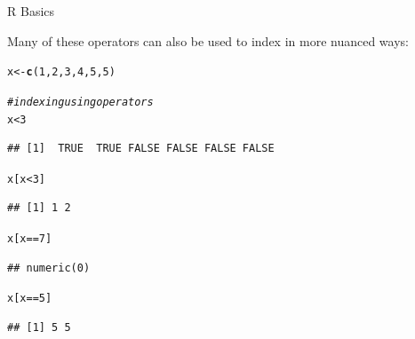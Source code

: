 \documentclass[svgnames,smaller]{beamer}\usepackage[]{graphicx}\usepackage[]{color}
\makeatletter
\newcommand{\hlnum}[1]{\textcolor[rgb]{0.686,0.059,0.569}{#1}}%
\newcommand{\hlcom}[1]{\textcolor[rgb]{0.678,0.584,0.686}{\textit{#1}}}%
\newcommand{\hlopt}[1]{\textcolor[rgb]{0,0,0}{#1}}%
\newcommand{\hlstd}[1]{\textcolor[rgb]{0.345,0.345,0.345}{#1}}%
\newcommand{\hlkwb}[1]{\textcolor[rgb]{0.69,0.353,0.396}{#1}}%
\newcommand{\hlkwd}[1]{\textcolor[rgb]{0.737,0.353,0.396}{\textbf{#1}}}%
\newenvironment{kframe}{%
 \def\at@end@of@kframe{}%
 \ifinner\ifhmode%
  \def\at@end@of@kframe{\end{minipage}}%
  \begin{minipage}{\columnwidth}%
 \fi\fi%
 \def\FrameCommand##1{\hskip\@totalleftmargin \hskip-\fboxsep
 \colorbox{shadecolor}{##1}\hskip-\fboxsep
     \hskip-\linewidth \hskip-\@totalleftmargin \hskip\columnwidth}%
 \MakeFramed {\advance\hsize-\width
   \@totalleftmargin\z@ \linewidth\hsize
   \@setminipage}}%
 {\par\unskip\endMakeFramed%
 \at@end@of@kframe}
\newenvironment{knitrout}{}{} %
\makeatother
\begin{document}
\begin{frame}[fragile]{R Basics}

Many of these operators can also be used to index in more nuanced ways: 
\begin{knitrout}\scriptsize
{}\color{fgcolor}\begin{kframe}
\begin{alltt}
\hlstd{x} \hlkwb{<-} \hlkwd{c}\hlstd{(}\hlnum{1}\hlstd{,} \hlnum{2}\hlstd{,} \hlnum{3}\hlstd{,} \hlnum{4}\hlstd{,} \hlnum{5}\hlstd{,} \hlnum{5}\hlstd{)}

\hlcom{# indexing using operators}
\hlstd{x} \hlopt{<} \hlnum{3}
\end{alltt}
\begin{verbatim}
## [1]  TRUE  TRUE FALSE FALSE FALSE FALSE
\end{verbatim}
\begin{alltt}
\hlstd{x[x} \hlopt{<} \hlnum{3}\hlstd{]}
\end{alltt}
\begin{verbatim}
## [1] 1 2
\end{verbatim}
\begin{alltt}
\hlstd{x[x} \hlopt{==} \hlnum{7}\hlstd{]}
\end{alltt}
\begin{verbatim}
## numeric(0)
\end{verbatim}
\begin{alltt}
\hlstd{x[x} \hlopt{==} \hlnum{5}\hlstd{]}
\end{alltt}
\begin{verbatim}
## [1] 5 5
\end{verbatim}
\end{kframe}
\end{knitrout}

\end{frame}


\end{document}
